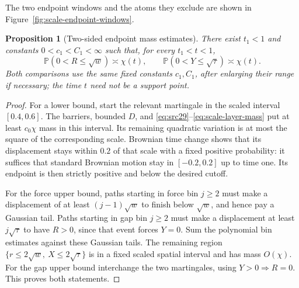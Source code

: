 \documentclass[11pt,a4paper]{article}
\numberwithin{equation}{section}
\newtheorem{proposition}[theorem]{Proposition}
\theoremstyle{definition}
\theoremstyle{remark}
\newcommand{\Prob}{\mathbb P}
\begin{document}
The two endpoint windows and the atoms they exclude are shown in
Figure~\ref{fig:scale-endpoint-windows}.
\begin{proposition}[Two-sided endpoint mass estimates]\label{prop:scale-endpoint-masses}
There exist $t_1<1$ and constants $0<c_1<C_1<\infty$ such that,
for every $t_1<t<1$,
\begin{equation}\label{eq:src31}
 \Prob(0<R\le\sqrt w)\asymp\chi(t),\qquad
 \Prob(0<Y\le\sqrt\tau)\asymp\chi(t).
\end{equation}
Both comparisons use the same fixed constants $c_1,C_1$, after
enlarging their range if necessary; the time $t$ need not be a support
point.
\end{proposition}
\begin{proof}
For a lower bound, start the relevant martingale in the scaled interval
$[0.4,0.6]$. The barriers, bounded $D$, and
\eqref{eq:src29}--\eqref{eq:scale-layer-mass} put at least $c_0\chi$
mass in this interval. Its remaining quadratic variation is at most
the square of the corresponding scale. Brownian time change shows
that its displacement stays within $0.2$ of that scale with a fixed
positive probability: it suffices that standard Brownian motion stay
in $[-0.2,0.2]$ up to time one. Its endpoint is then strictly positive
and below the desired cutoff.

For the force upper bound, paths starting in force bin $j\ge2$ must
make a displacement of at least $(j-1)\sqrt w$ to finish below
$\sqrt w$, and hence pay a Gaussian tail. Paths starting in gap bin
$j\ge2$ must make a displacement at least $j\sqrt\tau$ to have
$R>0$, since that event forces $Y=0$. Sum the polynomial bin estimates
against these Gaussian tails. The remaining region
$\{r\le2\sqrt w,\ X\le2\sqrt\tau\}$ is in a fixed scaled spatial
interval and has mass $O(\chi)$.
For the gap upper bound interchange the two martingales, using
$Y>0\Rightarrow R=0$. This proves both statements.
\end{proof}
\end{document}
